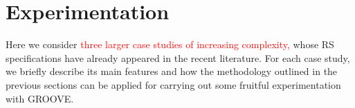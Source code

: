 
\section{Experimentation}\label{sec:experiments}

Here we consider 
\textcolor{red}{three larger case studies of increasing complexity,} whose RS specifications have already appeared in the recent literature. For each case study, we briefly describe its main features and how the methodology outlined in the previous sections can be applied for carrying out some fruitful experimentation with GROOVE.
